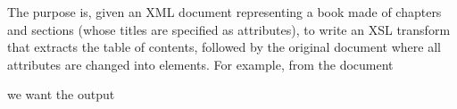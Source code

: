 The purpose is, given an \textsf{XML} document representing a book
made of chapters and sections (whose titles are specified as
attributes), to write an \textsf{XSL} transform that extracts the
table of contents, followed by the original document where all
attributes are changed into elements. For example, from the document

\newpage

\noindent we want the output
